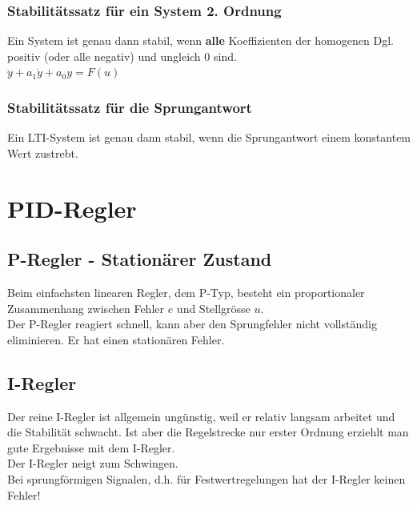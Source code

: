 		\subsubsection{Stabilitätssatz für ein System 2. Ordnung }
			Ein System ist genau dann stabil, wenn {\bf alle} Koeffizienten der
			homogenen Dgl. positiv (oder alle negativ) und ungleich 0 sind.\\
			$\ddot{y}+a_1\dot{y}+a_0y=F(u)$
			
		\subsubsection{Stabilitätssatz für die Sprungantwort}
			Ein LTI-System ist genau dann stabil, wenn die Sprungantwort einem
			konstantem Wert zustrebt.
			
\section{PID-Regler }

	\subsection{P-Regler - Stationärer Zustand }
		Beim einfachsten linearen Regler, dem P-Typ, besteht ein proportionaler
		Zusammenhang zwischen Fehler $e$ und Stellgrösse $u$.\\
		Der P-Regler reagiert schnell, kann aber den Sprungfehler nicht vollständig
		eliminieren. Er hat einen stationären Fehler.
		
	
	\subsection{I-Regler }
		Der reine I-Regler ist allgemein ungünstig, weil er relativ langsam arbeitet
		und die Stabilität schwacht. Ist aber die Regelstrecke nur erster Ordnung
		erziehlt man gute Ergebnisse mit dem I-Regler.\\
		Der I-Regler neigt zum Schwingen.\\
		Bei sprungförmigen Signalen, d.h. für Festwertregelungen hat der I-Regler
		keinen Fehler!
		
	
